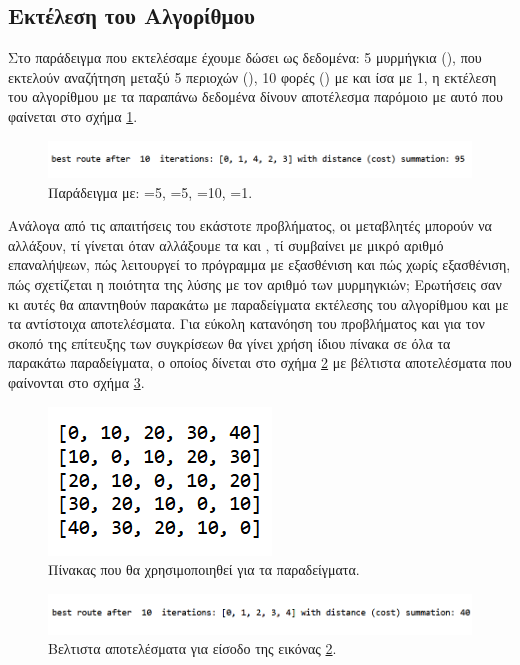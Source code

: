 \subsection{Εκτέλεση του Αλγορίθμου}
Στο παράδειγμα που εκτελέσαμε έχουμε δώσει ως δεδομένα: 5 μυρμήγκια (), που εκτελούν αναζήτηση μεταξύ 5 περιοχών (), 10 φορές () με  και  ίσα με 1, η εκτέλεση του αλγορίθμου με τα παραπάνω δεδομένα δίνουν αποτέλεσμα παρόμοιο με αυτό που φαίνεται στο σχήμα \ref{12}.

\begin{figure}
    \centering
    \includegraphics[scale=0.65]{2947_thesis/pictures/ex1.png} 
    \caption{Παράδειγμα με: =5, =5, =10, =1.}
    \label{12}
\end{figure}

Ανάλογα από τις απαιτήσεις του εκάστοτε προβλήματος, οι μεταβλητές μπορούν να αλλάξουν, τί γίνεται όταν αλλάξουμε τα  και , τί συμβαίνει με μικρό αριθμό επαναλήψεων, πώς λειτουργεί το πρόγραμμα με εξασθένιση και πώς χωρίς εξασθένιση, πώς σχετίζεται η ποιότητα της λύσης με τον αριθμό των μυρμηγκιών; Ερωτήσεις σαν κι αυτές θα απαντηθούν παρακάτω με παραδείγματα εκτέλεσης του αλγορίθμου και με τα αντίστοιχα αποτελέσματα. 
Για εύκολη κατανόηση του προβλήματος και για τον σκοπό της επίτευξης των συγκρίσεων θα γίνει χρήση ίδιου πίνακα  σε όλα τα παρακάτω παραδείγματα, ο οποίος δίνεται στο σχήμα \ref{13} με βέλτιστα αποτελέσματα που φαίνονται στο σχήμα \ref{14}.
\begin{figure}
    \centering
    \includegraphics[scale=1]{2947_thesis/pictures/distance.png} 
    \caption{Πίνακας  που θα χρησιμοποιηθεί για τα παραδείγματα.}
    \label{13}
\end{figure}
\begin{figure}
    \centering
    \includegraphics[scale=0.65]{2947_thesis/pictures/ex2.png} 
    \caption{Βελτιστα αποτελέσματα για είσοδο  της εικόνας \ref{13}.}
    \label{14}
\end{figure}

